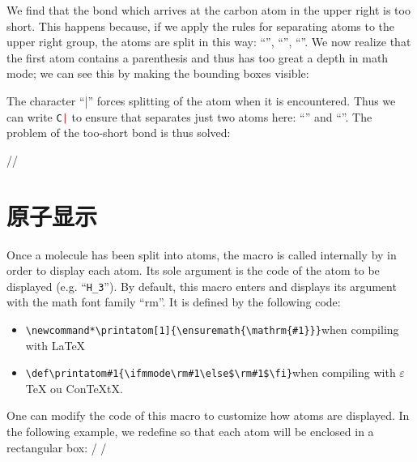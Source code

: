\documentclass[10pt]{article}
\begin{document}
We find that the bond which arrives at the carbon atom in the upper right is too short. This happens because, if we apply the \CF rules for separating atoms to the upper right group, the atoms are split in this way: ``\texttt{}'', ``\texttt{}'', ``\texttt{}''. We now realize that the first atom contains a parenthesis and thus has too great a depth in math mode; we can see this by making the bounding boxes visible:
\begin{center}
\fboxsep=0pt
\renewcommand*\printatom[1]{\fbox{\ensuremath{\mathrm{#1}}}}%
%
\end{center}
The character ``|'' forces splitting of the atom when it is encountered. Thus we can write \texttt{C\textcolor{red}{|}} to ensure that \CF separates just two atoms here: ``\texttt{}'' and ``\texttt{}''. The problem of the too-short bond is thus solved:

//

\section{原子显示}\label{perso.affichage}
Once a molecule has been split into atoms, the macro \idx{\printatom} is called internally by \CF in order to display each atom. Its sole argument is the code of the atom to be displayed (e.g. ``\verb-H_3-''). By default, this macro enters  and displays its argument with the math font family ``rm''. It is defined by the following code:
\begin{itemize}
	\item \verb|\newcommand*\printatom[1]{\ensuremath{\mathrm{#1}}}|\qquad when compiling with \LaTeX{}
	\item \verb|\def\printatom#1{\ifmmode\rm#1\else$\rm#1$\fi}|\qquad when compiling with $\varepsilon$\TeX{} ou Con\TeX tX.
\end{itemize}

One can modify the code of this macro to customize how atoms are displayed. In the following example, we redefine \idx{\printatom} so that each atom will be enclosed in a rectangular box:
/\fboxsep=1pt
\renewcommand*\printatom[1]{\fbox{\ensuremath{\mathrm{#1}}}}
/
\end{document}
